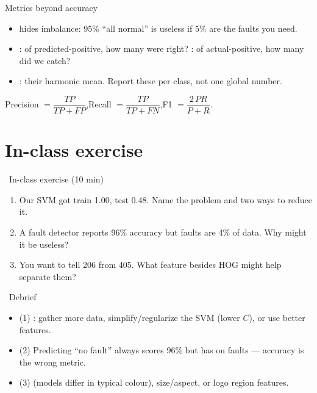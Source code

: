 \documentclass[10pt,aspectratio=169]{beamer}
\begin{document}
\begin{frame}{Metrics beyond accuracy}
  \begin{itemize}
    \item {} hides imbalance: 95\% ``all normal'' is useless if 5\% are the faults you need.
    \item {}: of predicted-positive, how many were right? : of actual-positive, how many did we catch?
    \item {}: their harmonic mean. Report these per class, not one global number.
  \end{itemize}
  \begin{mathbox}
    Precision $=\dfrac{TP}{TP+FP}$,\quad Recall $=\dfrac{TP}{TP+FN}$,\quad F1 $=\dfrac{2\,PR}{P+R}$.
  \end{mathbox}
\end{frame}

\section{In-class exercise}

\begin{frame}{\faPen~In-class exercise (10 min)}
  \begin{infobox}
  \end{infobox}
  \begin{enumerate}
    \item Our SVM got train 1.00, test 0.48. Name the problem and two ways to reduce it.
    \item A fault detector reports 96\% accuracy but faults are 4\% of data. Why might it be useless?
    \item You want to tell 206 from 405. What feature besides HOG might help separate them?
  \end{enumerate}
\end{frame}

\begin{frame}{\faPen~Debrief}
  \begin{itemize}
    \item (1) : gather more data, simplify/regularize the SVM (lower $C$), or use better features.
    \item (2) Predicting ``no fault'' always scores 96\% but has  on faults — accuracy is the wrong metric.
    \item (3)  (models differ in typical colour), size/aspect, or logo region features.
  \end{itemize}
\end{frame}
\end{document}
